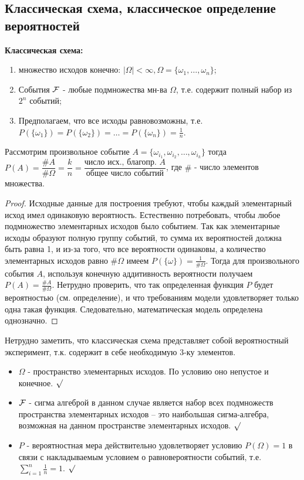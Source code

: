 \subsection{Классическая схема, классическое определение вероятностей}

\textbf{Классическая схема:}
\begin{enumerate}
	\item множество исходов конечно: $|\Omega| < \infty, \Omega = \{\omega_1,\dots,\omega_n\}$;
	\item События ${\mathcal F}$ - любые подмножества мн-ва $\Omega$, т.е. содержит полный набор из $2^n$ событий;
	\item Предполагаем, что все исходы равновозможны, т.е. $P(\{\omega_1\}) = P(\{\omega_2\}) = \dots = P(\{\omega_n\}) = \frac{1}{n}$.
\end{enumerate}
Рассмотрим произвольное событие $A = \{\omega_{i_1},\omega_{i_2}, \dots, \omega_{i_k}\}$ тогда
$P(A) = \dfrac{\#A}{\#\Omega}=\dfrac{k}{n}=\dfrac{\text{число исх., благопр. } A}{\text{общее число событий}}$, где $\#$ - число элементов множества.

\begin{proof}
	Исходные данные для построения требуют, чтобы  каждый элементарный исход имел одинаковую вероятность. Естественно потребовать, чтобы любое подмножество элементарных исходов было событием. Так как элементарные исходы образуют полную группу событий, то сумма их вероятностей должна быть равна 1, и из-за того, что все вероятности одинаковы, а количество  элементарных исходов равно $\# \Omega$ имеем $P(\{\omega\}) = \frac{1}{\# \Omega}$. Тогда для произвольного события $A$, используя конечную аддитивность вероятности получаем $P(A) = \frac{\# A}{\# \Omega}$. Нетрудно проверить, что так определенная функция $P$ будет вероятностью (см. определение), и что требованиям модели удовлетворяет только одна такая функция. Следовательно, математическая модель определена однозначно.
\end{proof}

\begin{remark}
	Нетрудно заметить, что классическая схема представляет собой вероятностный эксперимент, т.к. содержит в себе необходимую 3-ку элементов.
	\begin{itemize}
		\item $\Omega$ - пространство элементарных исходов. По условию оно непустое и конечное. $\surd$
		\item ${\mathcal F}$ - сигма алгеброй в данном случае является набор всех подмножеств пространства элементарных исходов – это наибольшая сигма-алгебра, возможная на данном пространстве элементарных исходов. $\surd$
		\item $P$ - вероятностная мера действительно удовлетворяет условию $P(\Omega) = 1$ в связи с накладываемым условием о равновероятности событий, т.е. $\sum\limits_{i=1}^n \frac{1}{n} = 1$. $\surd$
	\end{itemize}
\end{remark}

